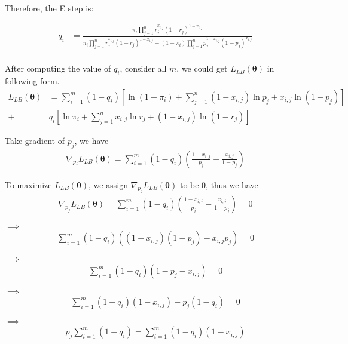 \documentclass[twoside,11pt]{homework}
\begin{document}
Therefore, the E step is: 

\begin{align*} 
q_i & = \frac {\pi _i  \prod _ {j =1} ^ n  r _ j ^ {x_{i, j}}  (1-r_j)^{1- x_{i,j}}}  {\pi _i  \prod _ {j =1} ^ n  r _ j ^ {x_{i, j}}  (1-r_j)^{1- x_{i,j}} + (1 - \pi _i)  \prod _ {j =1} ^ n  p _ j ^ {1 - x_{i, j}}  (1-p_j)^{x_{i,j}}}\\
\end{align*}

After computing the value of $q_i$, consider all $m$, we could get $L_{LB} ( \pmb \theta)$ in following form. 
\begin{align*}
L_{LB} ( \pmb \theta) &=  \sum _{ i = 1}^ m (1-q_i) [\ln (1 - \pi_i) + \sum_{j =1}^{n} (1 - x_{i, j})\ln p_j + x_{i,j} \ln (1 - p_j)] \\
+ & q_i [\ln \pi_i + \sum_{j =1}^{n}x_{i, j}\ln r_j + (1-x_{i,j}) \ln (1 - r_j)] 
\end{align*}

Take gradient of $p_j$, we have
\begin{align*}
\nabla_{p_j} L_{LB}( \pmb \theta)= \sum _ {i = 1} ^ {m} (1 - q_i) (\frac {1 - x_{i, j}} { p_{j}}   - \frac {x_{i, j}} {1 - p_{j}})
\end{align*}

To maximize $L_{LB}( \pmb \theta)$, we assign $\nabla_{p_j} L_{LB}( \pmb \theta)$ to be 0, thus we have 
\begin{align*}
\nabla_{p_j} L_{LB} ( \pmb \theta) = \sum _ {i = 1} ^ {m} (1 - q_i) (\frac {1 - x_{i, j}} { p_{j}}   - \frac {x_{i, j}} {1 - p_{j}}) = 0
\end{align*}

$\implies$
\begin{align*}
\sum _ {i = 1} ^ {m} (1 - q_i) (({1 - x_{i, j}})(1 - p_{j}) - {x_{i, j}} {p_{j}}) = 0
\end{align*}

$\implies$
\begin{align*}
\sum _ {i = 1} ^ {m} (1 - q_i) (1 - p_{j} - x_{i, j})= 0
\end{align*}

$\implies$
\begin{align*}
\sum _ {i = 1} ^ {m} (1 - q_i)(1 - x_{i, j}) - p_{j}(1-q_i)= 0
\end{align*}

$\implies$
\begin{align*}
p_j\sum _ {i = 1} ^ {m} (1 - q_i) =  \sum _ {i = 1} ^ {m} (1 - q_i)(1 - x_{i, j}) 
\end{align*}
\end{document}
